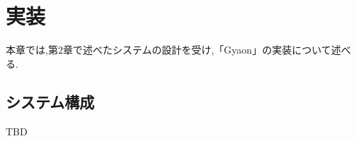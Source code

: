 \chapter{実装}
\label{chap:implementation}

本章では,第2章で述べたシステムの設計を受け,「Gyaon」の実装について述べる.

\newpage

\section{システム構成}

TBD
